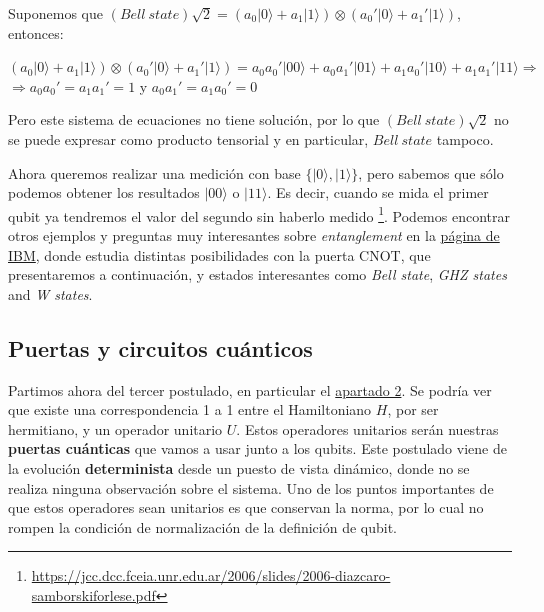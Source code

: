  Suponemos que $(Bell\:state)\sqrt{2} = (a_{0}|0\rangle+a_{1}|1\rangle) \otimes(a_{0}'|0\rangle+a_{1}'|1\rangle)$, entonces:
 
 \vspace{3pt}
     
 \begin{center}
 $(a_{0}|0\rangle+a_{1}|1\rangle)\otimes(a_{0}'|0\rangle+a_{1}'|1\rangle) =a_{0}a_{0}'|00\rangle + a_{0}a_{1}'|01\rangle + a_{1}a_{0}'|10\rangle + a_{1}a_{1}'|11\rangle \Rightarrow$ \\ $\Rightarrow a_{0}a_{0}'=a_{1}a_{1}'=1$ y $a_{0}a_{1}'=a_{1}a_{0}'=0$
 \end{center}
 
 \vspace{3pt}

 Pero este sistema de ecuaciones no tiene solución, por lo que $(Bell\:state)\sqrt{2}$ no se puede expresar como producto tensorial y en particular, $Bell\:state$ tampoco.\newline
 
 Ahora queremos realizar una medición con base $\{|0\rangle,|1\rangle\}$, pero sabemos que sólo podemos obtener los resultados $|00\rangle$ o $|11\rangle$. Es decir, cuando se mida el primer qubit ya tendremos el valor del segundo sin haberlo medido \footnote{\url{https://jcc.dcc.fceia.unr.edu.ar/2006/slides/2006-diazcaro-samborskiforlese.pdf}}. Podemos encontrar otros ejemplos y preguntas muy interesantes sobre \textit{entanglement} en la \href{https://quantum-computing.ibm.com/composer/docs/iqx/guide/entanglement}{página de IBM}, donde estudia distintas posibilidades con la puerta CNOT, que presentaremos a continuación, y estados interesantes como \textit{Bell state}, \textit{GHZ states} and \textit{W states}.


\subsection{Puertas y circuitos cuánticos}

 Partimos ahora del tercer postulado, en particular el \hyperref[Postulado3.2]{apartado 2}. Se podría ver que existe una correspondencia 1 a 1 entre el Hamiltoniano $H$, por ser hermitiano, y un operador unitario $U$. Estos operadores unitarios serán nuestras \textbf{puertas cuánticas} que vamos a usar junto a los qubits. Este postulado viene de la evolución \textbf{determinista} desde un puesto de vista dinámico, donde no se realiza ninguna observación sobre el sistema. Uno de los puntos importantes de que estos operadores sean unitarios es que conservan la norma, por lo cual no rompen la condición de normalización de la definición de qubit. \newline
 
